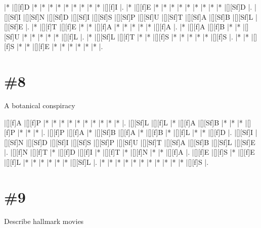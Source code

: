 \documentclass[letterpaper]{article}
\begin{document}
\vspace*{1em}
\begin{Puzzle}{12}{7}
|*        |[][f]D   |*        |*        |*        |*        |*        |*        |*        |*        |*        |[][f]I   |.
|*        |[][f]E   |*        |*        |*        |*        |*        |*        |*        |*        |*        |[][Sf]D  |.  
|[][Sf]I  |[][Sf]N  |[][Sf]D  |[][Sf]I  |[][Sf]S  |[][Sf]P  |[][Sf]U  |[][Sf]T  |[][Sf]A  |[][Sf]B  |[][Sf]L  |[][Sf]E  |.
|*        |[][f]T   |[][f]E   |*        |*        |[][f]A   |*        |*        |*        |*        |*        |[][f]A   |. 
|*        |[][f]A   |[][f]B   |*        |*        |[][Sf]U  |*        |*        |*        |*        |*        |[][f]L   |.
|*        |[][Sf]L  |[][f]T   |*        |*        |[][f]S   |*        |*        |*        |*        |*        |[][f]S   |.
|*        |*        |[][f]S   |*        |*        |[][f]E   |*        |*        |*        |*        |*        |*        |.
\end{Puzzle}

\section*{\#8}
A botanical conspiracy

\vspace*{1em}
\begin{Puzzle}{12}{7}
|[][f]A   |[][f]P   |*        |*        |*        |*        |*        |*        |*        |*        |*        |*        |.  
|[][Sf]L  |[][f]L   |*        |[][f]A   |[][Sf]B  |*        |*        |*        |[][f]P   |*        |*        |*        |.
|[][f]P   |[][f]A   |*        |[][Sf]B  |[][f]A   |*        |[][f]B   |*        |[][f]L   |*        |*        |[][f]D   |.  
|[][Sf]I  |[][Sf]N  |[][Sf]D  |[][Sf]I  |[][Sf]S  |[][Sf]P  |[][Sf]U  |[][Sf]T  |[][Sf]A  |[][Sf]B  |[][Sf]L  |[][Sf]E  |.
|[][f]N   |[][f]T   |*        |[][f]D   |[][f]I   |*        |[][f]T   |*        |[][f]N   |*        |*        |[][f]A   |. 
|[][f]E   |[][f]S   |*        |[][f]E   |[][f]L   |*        |*        |*        |*        |*        |*        |[][Sf]L  |.
|*        |*        |*        |*        |*        |*        |*        |*        |*        |*        |*        |[][f]S   |.
\end{Puzzle}

\section*{\#9}
Describe hallmark movies
\end{document}
